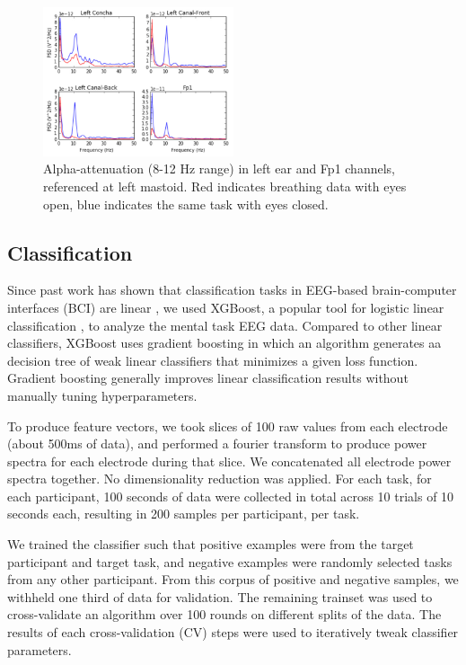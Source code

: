 \documentclass{sigchi}
\begin{document}
\begin{figure}[h]
\centering
\includegraphics[width=0.5\textwidth]{figures/002_AlphaAtt_all.jpg}
\caption{Alpha-attenuation (8-12 Hz range) in left ear and Fp1 channels, referenced at left mastoid. Red indicates breathing data with eyes open, blue indicates the same task with eyes closed.}
\label{fig:alpha_atten}
\end{figure}

\subsection{Classification}

Since past work has shown that classification tasks in EEG-based brain-computer interfaces (BCI) are linear \cite{Garrett2003a}, we used XGBoost, a popular tool for logistic linear classification \cite{Chen2016}, to analyze the mental task EEG data. Compared to other linear classifiers, XGBoost uses gradient boosting in which an algorithm generates aa decision tree of weak linear classifiers that minimizes a given loss function. Gradient boosting generally improves linear classification results without manually tuning hyperparameters.

To produce feature vectors, we took slices of 100 raw values from each electrode (about 500ms of data), and performed a fourier transform to produce power spectra for each electrode during that slice. We concatenated all electrode power spectra together. No dimensionality reduction was applied. For each task, for each participant, 100 seconds of data were collected in total across 10 trials of 10 seconds each, resulting in 200 samples per participant, per task.

We trained the classifier such that positive examples were from the target participant and target task, and negative examples were randomly selected tasks from any other participant. From this corpus of positive and negative samples, we withheld one third of data for validation. The remaining trainset was used to cross-validate an algorithm over 100 rounds on different splits of the data. The results of each cross-validation (CV) steps were used to iteratively tweak classifier parameters. 
\end{document}
